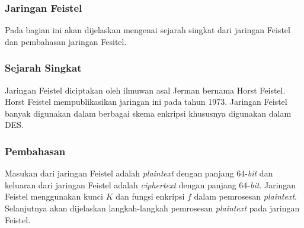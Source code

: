 \subsubsection{Jaringan Feistel}

Pada bagian ini akan dijelaskan mengenai sejarah singkat dari jaringan Feistel dan pembahasan jaringan Fesitel.

\subsubsection{Sejarah Singkat}

Jaringan Feistel diciptakan oleh ilmuwan asal Jerman bernama Horst Feistel. Horst Feistel mempublikasikan jaringan ini pada tahun 1973. Jaringan Feistel banyak digunakan dalam berbagai skema enkripsi khususnya digunakan dalam DES.

\subsubsection{Pembahasan}

Masukan dari jaringan Feistel adalah \textit{plaintext} dengan panjang 64-\textit{bit} dan keluaran dari jaringan Feistel adalah \textit{ciphertext} dengan panjang 64-\textit{bit}. Jaringan Feistel menggunakan kunci \begin{math}K\end{math} dan fungsi enkripsi \begin{math}f\end{math} dalam pemrosesan \textit{plaintext}. Selanjutnya akan dijelaskan langkah-langkah pemrosesan \textit{plaintext} pada jaringan Feistel.

